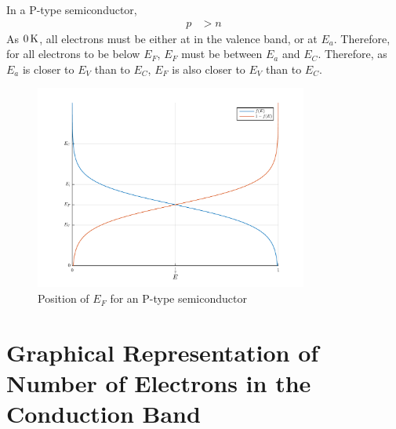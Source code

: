 \documentclass[titlepage, fleqn, a4paper, 12pt, twoside]{article}
\theoremstyle{definition}
\theoremstyle{theorem}
\begin{document}
In a P-type semiconductor,
\begin{align*}
	p & > n
\end{align*}
As $0 \kelvin$, all electrons must be either at in the valence band, or at $E_a$.
Therefore, for all electrons to be below $E_F$, $E_F$ must be between $E_a$ and $E_C$.
Therefore, as $E_a$ is closer to $E_V$ than to $E_C$, $E_F$ is also closer to $E_V$ than to $E_C$.
\begin{figure}[h]
	\centering
	\includegraphics[width = 0.8\textwidth]{./Plots/fermi_function_for_P_type.pdf}
	\caption{Position of $E_F$ for an P-type semiconductor}
	\label{fig:Position_of_$E_F$_for_an_P-type_semiconductor}
\end{figure}

\section{Graphical Representation of Number of Electrons in the Conduction Band}
\end{document}
